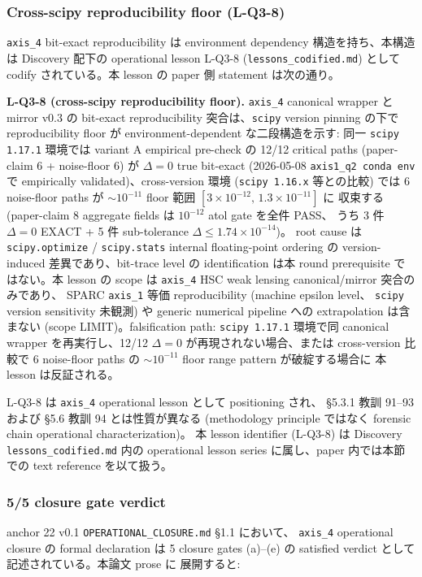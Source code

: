 \documentclass[11pt,a4paper]{ltjsarticle}
\begin{document}
\subsubsection{Cross-scipy reproducibility floor (L-Q3-8)}
\texttt{axis\_4} bit-exact reproducibility は environment dependency
構造を持ち、本構造は Discovery 配下の operational lesson L-Q3-8
(\texttt{lessons\_codified.md}) として codify されている。本 lesson の
paper 側 statement は次の通り。

\smallskip
\noindent
\textbf{L-Q3-8 (cross-scipy reproducibility floor).}\quad
\texttt{axis\_4} canonical wrapper と mirror v0.3 の bit-exact reproducibility
突合は、\texttt{scipy} version pinning の下で reproducibility floor が
environment-dependent な二段構造を示す: 同一 \texttt{scipy 1.17.1} 環境では
variant A empirical pre-check の 12/12 critical paths (paper-claim 6 +
noise-floor 6) が $\Delta = 0$ true bit-exact (2026-05-08
\texttt{axis1\_q2 conda env} で empirically validated)、cross-version 環境
(\texttt{scipy 1.16.x} 等との比較) では 6 noise-floor paths が
$\sim 10^{-11}$ floor 範囲 $[3 \times 10^{-12},\, 1.3 \times 10^{-11}]$ に
収束する (paper-claim 8 aggregate fields は $10^{-12}$ atol gate を全件 PASS、
うち 3 件 $\Delta = 0$ EXACT + 5 件 sub-tolerance $\Delta \leq 1.74 \times 10^{-14}$)。
root cause は \texttt{scipy.optimize} / \texttt{scipy.stats} internal
floating-point ordering の version-induced 差異であり、bit-trace level の
identification は本 round prerequisite ではない。本 lesson の scope は
\texttt{axis\_4} HSC weak lensing canonical/mirror 突合のみであり、
SPARC \texttt{axis\_1} 等価 reproducibility (machine epsilon level、
\texttt{scipy} version sensitivity 未観測) や generic numerical pipeline
への extrapolation は含まない (scope LIMIT)。falsification path:
\texttt{scipy 1.17.1} 環境で同 canonical wrapper を再実行し、12/12
$\Delta = 0$ が再現されない場合、または cross-version 比較で
6 noise-floor paths の $\sim 10^{-11}$ floor range pattern が破綻する場合に
本 lesson は反証される。

\smallskip
\noindent
L-Q3-8 は \texttt{axis\_4} operational lesson として positioning され、
\S 5.3.1 教訓 91--93 および \S 5.6 教訓 94 とは性質が異なる
(methodology principle ではなく forensic chain operational characterization)。
本 lesson identifier (L-Q3-8) は Discovery \texttt{lessons\_codified.md}
内の operational lesson series に属し、paper 内では本節での text reference
を以て扱う。

\subsubsection{5/5 closure gate verdict}
anchor 22 v0.1 \texttt{OPERATIONAL\_CLOSURE.md} \S 1.1 において、
\texttt{axis\_4} operational closure の formal declaration は 5 closure
gates (a)--(e) の satisfied verdict として記述されている。本論文 prose に
展開すると:
\end{document}
